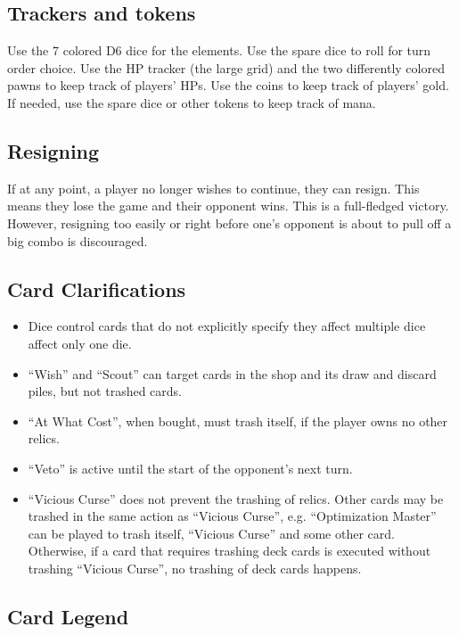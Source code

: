 \documentclass[dvipsnames,parskip,a4paper]{scrartcl}
\begin{document}
\subsection*{Trackers and tokens}

Use the 7 colored D6 dice for the elements. Use the spare dice to roll for turn order choice. Use the HP tracker (the large grid) and the two differently colored pawns to keep track of players' HPs. Use the coins to keep track of players' gold. If needed, use the spare dice or other tokens to keep track of mana.

\subsection*{Resigning}

If at any point, a player no longer wishes to continue, they can resign. This means they lose the game and their opponent wins. This is a full-fledged victory. However, resigning too easily or right before one's opponent is about to pull off a big combo is discouraged.

\subsection*{Card Clarifications}

\begin{itemize}
\item Dice control cards that do not explicitly specify they affect multiple dice affect only one die.
\item ``Wish'' and ``Scout'' can target cards in the shop and its draw and discard piles, but not trashed cards.
\item ``At What Cost'', when bought, must trash itself, if the player owns no other relics.
\item ``Veto'' is active until the start of the opponent's next turn.
\item ``Vicious Curse'' does not prevent the trashing of relics. Other cards may be trashed in the same action as ``Vicious Curse'', e.g. ``Optimization Master'' can be played to trash itself, ``Vicious Curse'' and some other card. Otherwise, if a card that requires trashing deck cards is executed without trashing ``Vicious Curse'', no trashing of deck cards happens.
\end{itemize}

\subsection*{Card Legend}
\end{document}
